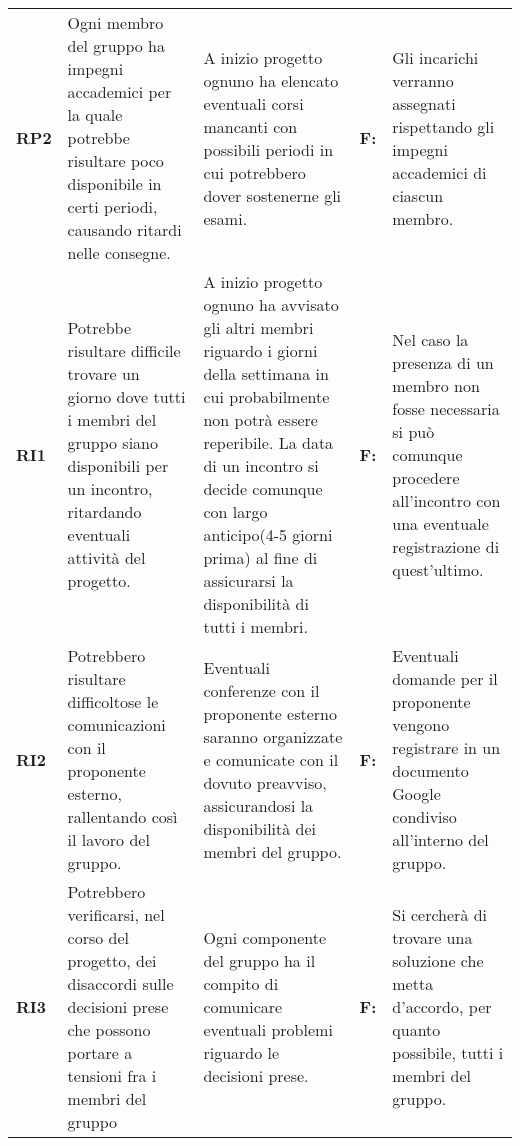 {\begin{longtable}{C{2.5cm} C{3.25cm} C{3.25cm} C{1.5cm} C{3cm}}
\textbf{RP2} & 
Ogni membro del gruppo ha impegni accademici per la quale potrebbe risultare poco disponibile in certi periodi, causando ritardi nelle consegne. & 
A inizio progetto ognuno ha elencato eventuali corsi mancanti con possibili periodi in cui potrebbero dover sostenerne gli esami. &
\textbf{F:}  &
Gli incarichi verranno assegnati rispettando gli impegni accademici di ciascun membro.\\

\textbf{RI1} & 
Potrebbe risultare difficile trovare un giorno dove tutti i membri del gruppo siano disponibili per un incontro, ritardando eventuali attività del progetto. & 
A inizio progetto ognuno ha avvisato gli altri membri riguardo i giorni della settimana in cui probabilmente non potrà essere reperibile. La data di un incontro si decide comunque con largo anticipo(4-5 giorni prima) al fine di assicurarsi la disponibilità di tutti i membri. &
\textbf{F:}  &
Nel caso la presenza di un membro non fosse necessaria si può comunque procedere all'incontro con una eventuale registrazione di quest'ultimo.\\

\textbf{RI2} & 
Potrebbero risultare difficoltose le comunicazioni con il proponente esterno, rallentando così il lavoro del gruppo. & 
Eventuali conferenze con il proponente esterno saranno organizzate e comunicate con il dovuto preavviso, assicurandosi la disponibilità dei membri del gruppo. &
\textbf{F:}  &
Eventuali domande per il proponente vengono registrare in un documento Google condiviso all'interno del gruppo. \\

\textbf{RI3} & 
Potrebbero verificarsi, nel corso del progetto, dei disaccordi sulle decisioni prese che possono portare a tensioni fra i membri del gruppo & 
Ogni componente del gruppo ha il compito di comunicare eventuali problemi riguardo le decisioni prese. &
\textbf{F:}  &
Si cercherà di trovare una soluzione che metta d'accordo, per quanto possibile, tutti i membri del gruppo. \\


\end{longtable}}
